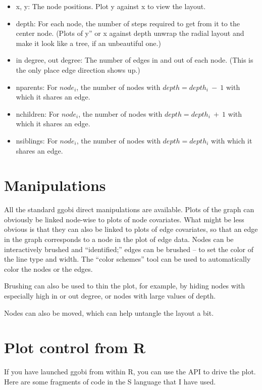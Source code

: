 \documentclass[11pt]{article}
\begin{document}
\begin{itemize}
\item x, y: The node positions.  Plot y against x to view the layout.
\item depth: For each node, the number of steps required to get from it
  to the center node. (Plots of y'' or x against depth unwrap the
  radial layout and make it look like a tree, if an unbeautiful one.)
\item in degree, out degree:  The number of edges in and out of each
  node. (This is the only place edge direction shows up.)
\item nparents: For $node_i$, the number of nodes with $depth = depth_i~-~1$
  with which it shares an edge. 
\item nchildren: For $node_i$, the number of nodes with $depth = depth_i~+~1$
  with which it shares an edge.
\item nsiblings: For $node_i$, the number of nodes with $depth = depth_i$
  with which it shares an edge.
\end{itemize}

\section{Manipulations}

All the standard ggobi direct manipulations are available.  Plots of
the graph can obviously be linked node-wise to plots of node covariates.
What might be less obvious is that they can also be linked to plots of
edge covariates, so that an edge in the graph corresponds to a node in the
plot of edge data.  Nodes can be interactively brushed and ``identified;''
edges can be brushed -- to set the color of the line type and width.
The ``color schemes'' tool can be used to automatically color the nodes
or the edges.

Brushing can also be used to thin the plot, for example, by hiding
nodes with especially high in or out degree, or nodes with large
values of depth.

Nodes can also be moved, which can help untangle the layout a bit.

\section{Plot control from R}

If you have launched ggobi from within R, you can use the API to
drive the plot.  Here are some fragments of code in the S language
that I have used.
\end{document}
